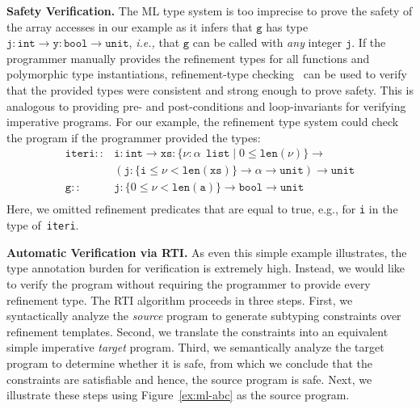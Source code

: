 \documentclass[nocopyrightspace]{sigplanconf}
\def\mypara#1{\smallskip\noindent\textbf{#1}}
\def\set#1{{\{ #1\}}}
\newcommand{\ie}{\textit{i.e.,}\xspace}
\newcommand\ML{\textsc{ML}\xspace}
\newcommand\HMC{\textsc{RTI}\xspace}
\newcommand{\ttg}{\mathtt{g}}
\newcommand{\ttxs}{\mathtt{xs}}
\newcommand{\tty}{\mathtt{y}}
\newcommand{\tta}{\mathtt{a}}
\newcommand{\tti}{\mathtt{i}}
\newcommand{\ttj}{\mathtt{j}}
\newcommand{\ttiteri}{\mathtt{iteri}}
\def\ttxs{\mathtt{xs}}
\newcommand{\ttlenl}{{\ttlen}\xspace}
\newcommand{\ttlena}{{\ttlen}\xspace}
\def\valu{\nu}
\newcommand{\ftyp}[2]{{{#1}\!:\!{#2}}}
\newcommand{\ttlist}{\ \mathtt{list}}
\newcommand{\hastype}{::}
\def\ttint{\mathtt{int}}
\def\ttbool{\mathtt{bool}}
\newcommand{\ttunit}{\mathtt{unit}}
\newcommand{\reftyp}[3]{\set{\ftyp{{#1}}{{#2}} \mid {#3}}}
\newcommand{\sreftyp}[1]{\set{{#1}}}
\newcommand{\ttlen}{\mathtt{len}}
\begin{document}
\mypara{Safety Verification.}
The \ML type system is too imprecise to prove the safety 
of the array accesses in our example as it infers that $\ttg$ 
has type
${\ftyp{\ttj}{\ttint} \rightarrow \ftyp{\tty}{\ttbool} \rightarrow \ttunit}$,
\ie that $\ttg$ can be called with \emph{any} integer $\ttj$.
If the programmer manually provides the refinement types
for all functions and polymorphic type instantiations,
refinement-type checking~\cite{XiPfenning99,Dunfield,GordonRefinement09}
can be used to verify that the provided types were consistent
and strong enough to prove safety. 
This is analogous to providing pre- and post-conditions and loop-invariants 
for verifying imperative programs.
For our example, the refinement type system could check the program 
if the programmer provided the types:
$$
\begin{array}{rl}
\ttiteri \hastype & \ftyp{\tti}{\ttint} \rightarrow
	 	      \ftyp{\ttxs}{\reftyp{\valu}{\alpha\ \ttlist}{0 \leq \ttlenl(\valu)}} \rightarrow \\
         	    & (\ftyp{\ttj}{\sreftyp{\tti \leq \valu < \ttlenl(\ttxs)}} \rightarrow \alpha \rightarrow \ttunit) \rightarrow \ttunit\\
\ttg \hastype & \ftyp{\ttj}{\sreftyp{0 \leq \valu < \ttlena(\tta)}} \rightarrow \ttbool \rightarrow \ttunit\\
\end{array}
$$
Here, we omitted refinement predicates that are equal to true, e.g.,
for \texttt{i} in the type of~\texttt{iteri}.

\mypara{Automatic Verification via \HMC.}
As even this simple example illustrates, the type annotation burden for
verification is extremely high.
Instead, we would like to verify the program without requiring the programmer
to provide every refinement type.
The \HMC algorithm proceeds in three steps. 
First, we syntactically analyze the \emph{source} program to generate 
subtyping constraints over refinement templates.
Second, we translate the constraints into an equivalent simple imperative
\emph{target} program.
Third, we semantically analyze the target program to determine whether
it is safe, from which we conclude that the constraints are satisfiable and
hence, the source program is safe.
Next, we illustrate these steps using Figure~\ref{ex:ml-abc} as
the source program.
\end{document}
